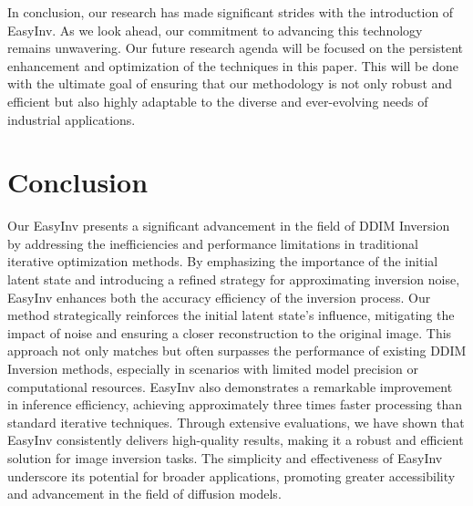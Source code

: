 \documentclass[letterpaper]{article} %
\begin{document}
In conclusion, our research has made significant strides with the introduction of EasyInv. As we look ahead, our commitment to advancing this technology remains unwavering. Our future research agenda will be focused on the persistent enhancement and optimization of the techniques in this paper. This will be done with the ultimate goal of ensuring that our methodology is not only robust and efficient but also highly adaptable to the diverse and ever-evolving needs of industrial applications.

\section{Conclusion}
Our EasyInv presents a significant advancement in the field of DDIM Inversion by addressing the inefficiencies and performance limitations in traditional iterative optimization methods. By emphasizing the importance of the initial latent state and introducing a refined strategy for approximating inversion noise, EasyInv enhances both the accuracy efficiency of the inversion process. Our method strategically reinforces the initial latent state's influence, mitigating the impact of noise and ensuring a closer reconstruction to the original image. This approach not only matches but often surpasses the performance of existing DDIM Inversion methods, especially in scenarios with limited model precision or computational resources. EasyInv also demonstrates a remarkable improvement in inference efficiency, achieving approximately three times faster processing than standard iterative techniques. Through extensive evaluations, we have shown that EasyInv consistently delivers high-quality results, making it a robust and efficient solution for image inversion tasks. The simplicity and effectiveness of EasyInv underscore its potential for broader applications, promoting greater accessibility and advancement in the field of diffusion models.




































\end{document}
